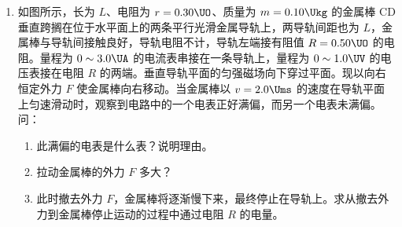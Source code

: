 \documentclass[\gkver]{gaokaozhenti}
\begin{document}
\begin{enumerate}
{\begin{enumerate}
	\item
	$T_{2} = \frac{\left(p_{0} + \frac{mg}{S} + 2\rho gh\right)(L + h)}{p_{0}L}T_{0}$

\end{enumerate}
}

\item
如图所示，长为 $L$、电阻为 $r = 0.30\UO$、质量为 $m = 0.10\Ukg$ 的金属棒 CD 垂直跨搁在位于水平面上的两条平行光滑金属导轨上，两导轨间距也为 $L$，金属棒与导轨间接触良好，导轨电阻不计，导轨左端接有阻值 $R = 0.50\UO$ 的电阻。量程为 $0\sim3.0\UA$ 的电流表串接在一条导轨上，量程为 $0\sim1.0\UV$ 的电压表接在电阻 $R$ 的两端。垂直导轨平面的匀强磁场向下穿过平面。现以向右恒定外力 $F$ 使金属棒向右移动。当金属棒以 $v = 2.0\Ums$ 的速度在导轨平面上匀速滑动时，观察到电路中的一个电表正好满偏，而另一个电表未满偏。问：
\begin{enumerate}
	\item
	此满偏的电表是什么表？说明理由。
	\item
	拉动金属棒的外力 $F$ 多大？
	\item
	此时撤去外力 $F$，金属棒将逐渐慢下来，最终停止在导轨上。求从撤去外力到金属棒停止运动的过程中通过电阻 $R$ 的电量。
\end{enumerate}
\onepicture[w=7cm, align=right]{}
\end{enumerate}
\end{document}
